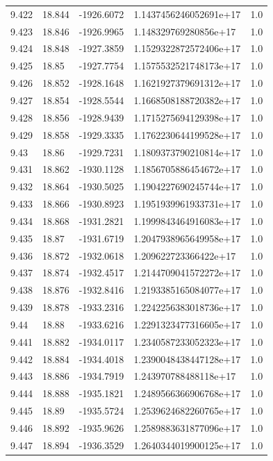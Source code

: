 \begin{tabular}{lllll}
9.422 & 18.844 & -1926.6072 & 1.1437456246052691e+17 & 1.0 \\
9.423 & 18.846 & -1926.9965 & 1.148329769280856e+17 & 1.0 \\
9.424 & 18.848 & -1927.3859 & 1.1529322872572406e+17 & 1.0 \\
9.425 & 18.85 & -1927.7754 & 1.1575532521748173e+17 & 1.0 \\
9.426 & 18.852 & -1928.1648 & 1.1621927379691312e+17 & 1.0 \\
9.427 & 18.854 & -1928.5544 & 1.1668508188720382e+17 & 1.0 \\
9.428 & 18.856 & -1928.9439 & 1.1715275694129398e+17 & 1.0 \\
9.429 & 18.858 & -1929.3335 & 1.1762230644199528e+17 & 1.0 \\
9.43 & 18.86 & -1929.7231 & 1.1809373790210814e+17 & 1.0 \\
9.431 & 18.862 & -1930.1128 & 1.1856705886454672e+17 & 1.0 \\
9.432 & 18.864 & -1930.5025 & 1.1904227690245744e+17 & 1.0 \\
9.433 & 18.866 & -1930.8923 & 1.1951939961933731e+17 & 1.0 \\
9.434 & 18.868 & -1931.2821 & 1.1999843464916083e+17 & 1.0 \\
9.435 & 18.87 & -1931.6719 & 1.2047938965649958e+17 & 1.0 \\
9.436 & 18.872 & -1932.0618 & 1.209622723366422e+17 & 1.0 \\
9.437 & 18.874 & -1932.4517 & 1.2144709041572272e+17 & 1.0 \\
9.438 & 18.876 & -1932.8416 & 1.2193385165084077e+17 & 1.0 \\
9.439 & 18.878 & -1933.2316 & 1.2242256383018736e+17 & 1.0 \\
9.44 & 18.88 & -1933.6216 & 1.2291323477316605e+17 & 1.0 \\
9.441 & 18.882 & -1934.0117 & 1.2340587233052323e+17 & 1.0 \\
9.442 & 18.884 & -1934.4018 & 1.2390048438447128e+17 & 1.0 \\
9.443 & 18.886 & -1934.7919 & 1.243970788488118e+17 & 1.0 \\
9.444 & 18.888 & -1935.1821 & 1.2489566366906768e+17 & 1.0 \\
9.445 & 18.89 & -1935.5724 & 1.2539624682260765e+17 & 1.0 \\
9.446 & 18.892 & -1935.9626 & 1.2589883631877096e+17 & 1.0 \\
9.447 & 18.894 & -1936.3529 & 1.2640344019900125e+17 & 1.0 \\

\end{tabular}
